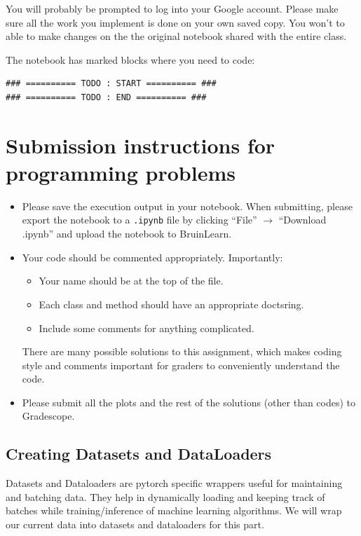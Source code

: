 You will probably be prompted to log into your Google account. Please make sure all the work you implement is done on your own saved copy. You won’t to able to make changes on the the original notebook shared with the entire class.

The notebook has marked blocks where you need to code:
\begin{verbatim}
### ========== TODO : START ========== ###
### ========== TODO : END ========== ###
\end{verbatim}

\section*{Submission instructions for programming problems}
\begin{itemize}
\item Please save the execution output in your notebook. When submitting, please export the notebook to a \verb|.ipynb| file by clicking ``File'' $\rightarrow$ ``Download .ipynb'' and upload the notebook to BruinLearn.

\item
Your code should be commented appropriately. Importantly:
\begin{itemize}[nosep]
\item Your name should be at the top of the file.
\item Each class and method should have an appropriate doctsring.
\item Include some comments for anything complicated.
\end{itemize}

There are many possible solutions to this assignment, which makes coding style and comments important for graders to conveniently understand the code. 
\item Please submit all the plots and the rest of the solutions (other than codes) to Gradescope.
\end{itemize}

\subsection{Creating Datasets and DataLoaders }

Datasets and Dataloaders are pytorch specific wrappers useful for maintaining and batching data. They help in dynamically loading and keeping track of batches while training/inference of machine learning algorithms. We will wrap our current data into datasets and dataloaders for this part.

